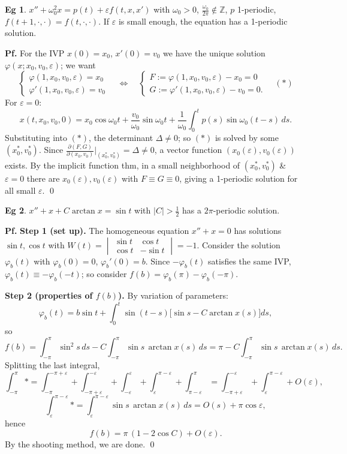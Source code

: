 \documentclass[11pt]{article}
\theoremstyle{definition}
\newtheorem*{example}{Eg}
\theoremstyle{remark}
\newcommand{\Z}{\mathbb{Z}}
\begin{document}
\begin{example}
$x''+\omega_0^2x=p(t)+\varepsilon f(t,x,x')$ with $\omega_0>0$, $\frac{\omega_0}{2\pi}\notin\Z$,
$p$ 1-periodic, $f(t+1,\cdot,\cdot)=f(t,\cdot,\cdot)$. If $\varepsilon$ is small enough, the
equation has a 1-periodic solution.

\textbf{Pf.} For the IVP $x(0)=x_0$, $x'(0)=v_0$ we have the unique solution
$\varphi(x;x_0,v_0,\varepsilon)$; we want
\[
\begin{cases} \varphi(1,x_0,v_0,\varepsilon)=x_0\\ \varphi'(1,x_0,v_0,\varepsilon)=v_0 \end{cases}
\quad\Longleftrightarrow\quad
\begin{cases} F:=\varphi(1,x_0,v_0,\varepsilon)-x_0=0\\ G:=\varphi'(1,x_0,v_0,\varepsilon)-v_0=0. \end{cases}\quad(*)
\]
For $\varepsilon=0$:
\[
x(t,x_0,v_0,0)=x_0\cos\omega_0t+\frac{v_0}{\omega_0}\sin\omega_0t+\frac{1}{\omega_0}\int_0^{t}p(s)\sin\omega_0(t-s)\,ds.
\]
Substituting into $(*)$, the determinant $\Delta\neq0$; so $(*)$ is solved by some $(x_0^*,v_0^*)$.
Since $\frac{\partial(F,G)}{\partial(x_0,v_0)}\big|_{(x_0^*,v_0^*)}=\Delta\neq0$, a vector function
$(x_0(\varepsilon),v_0(\varepsilon))$ exists. By the implicit function thm, in a small neighborhood
of $(x_0^*,v_0^*)$ \& $\varepsilon=0$ there are $x_0(\varepsilon),v_0(\varepsilon)$ with
$F\equiv G\equiv0$, giving a 1-periodic solution for all small $\varepsilon$. \qed
\end{example}

\begin{example}
$x''+x+C\arctan x=\sin t$ with $|C|>\frac12$ has a $2\pi$-periodic solution.

\textbf{Pf.} \textbf{Step 1 (set up).} The homogeneous equation $x''+x=0$ has solutions
$\sin t,\cos t$ with $W(t)=\begin{vmatrix}\sin t & \cos t\\ \cos t & -\sin t\end{vmatrix}=-1$.
Consider the solution $\varphi_b(t)$ with $\varphi_b(0)=0$, $\varphi_b'(0)=b$. Since $-\varphi_b(t)$
satisfies the same IVP, $\varphi_b(t)\equiv-\varphi_b(-t)$; so consider
$f(b)=\varphi_b(\pi)-\varphi_b(-\pi)$.

\textbf{Step 2 (properties of $f(b)$).} By variation of parameters:
\[
\varphi_b(t)=b\sin t+\int_0^{t}\sin(t-s)\bigl[\sin s-C\arctan x(s)\bigr]ds,
\]
so
\[
f(b)=\int_{-\pi}^{\pi}\sin^2s\,ds-C\int_{-\pi}^{\pi}\sin s\,\arctan x(s)\,ds
=\pi-C\int_{-\pi}^{\pi}\sin s\,\arctan x(s)\,ds.
\]
Splitting the last integral,
\[
\int_{-\pi}^{\pi}*=\int_{-\pi}^{-\pi+\varepsilon}+\int_{-\pi+\varepsilon}^{-\varepsilon}+\int_{-\varepsilon}^{\varepsilon}+\int_{\varepsilon}^{\pi-\varepsilon}+\int_{\pi-\varepsilon}^{\pi}
=\int_{-\pi+\varepsilon}^{-\varepsilon}+\int_{\varepsilon}^{\pi-\varepsilon}+O(\varepsilon),
\]
\[
\int_{\varepsilon}^{\pi-\varepsilon}*=\int_{\varepsilon}^{\pi-\varepsilon}\sin s\,\arctan x(s)\,ds=O(s)+\pi\cos\varepsilon,
\]
hence
\[
f(b)=\pi\,(1-2\cos C)+O(\varepsilon).
\]
By the shooting method, we are done. \qed
\end{example}
\end{document}
